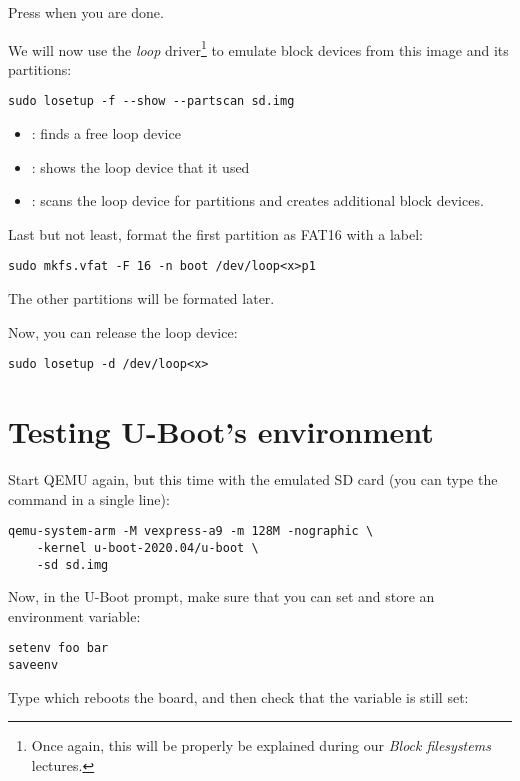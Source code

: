 Press  when you are done.

We will now use the {\em loop} driver\footnote{Once again, this will
be properly be explained during our {\em Block filesystems} lectures.}
to emulate block devices from this image and its partitions:

\begin{verbatim}
sudo losetup -f --show --partscan sd.img
\end{verbatim}

\begin{itemize}
\item {}: finds a free loop device
\item {}: shows the loop device that it used
\item {}: scans the loop device for partitions
    and creates additional  block devices.
\end{itemize}

Last but not least, format the first partition as FAT16 with
a  label:

\begin{verbatim}
sudo mkfs.vfat -F 16 -n boot /dev/loop<x>p1
\end{verbatim}

The other partitions will be formated later.

Now, you can release the loop device:
\begin{verbatim}
sudo losetup -d /dev/loop<x>
\end{verbatim}

\section{Testing U-Boot's environment}

Start QEMU again, but this time with the emulated SD card
(you can type the command in a single line):

\begin{verbatim}
qemu-system-arm -M vexpress-a9 -m 128M -nographic \
	-kernel u-boot-2020.04/u-boot \
	-sd sd.img
\end{verbatim}

Now, in the U-Boot prompt, make sure that you can set and store an environment variable:

\begin{verbatim}
setenv foo bar
saveenv
\end{verbatim}

Type  which reboots the board, and then check that the
 variable is still set:

